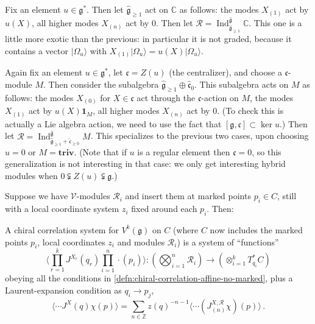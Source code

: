 \documentclass[12pt,letterpaper,reqno]{amsart}
\numberwithin{equation}{section}
\newcommand{\fg}{{\mathfrak g}}
\newcommand{\fc}{{\mathfrak c}}
\newcommand{\hfg}{{\widehat\fg}}
\newcommand{\hfc}{{\widehat\fc}}
\newcommand{\bbC}{\ensuremath{\mathbb C}}
\newcommand{\bbZ}{\ensuremath{\mathbb Z}}
\newcommand\bid{{\mathbf 1}}
\newcommand\vacu{{|\Omega_u\rangle}}
\newcommand\triv{{\mathbf {triv}}}
\newcommand{\vertex}{\mathcal{V}}
\newcommand{\vrep}{\mathcal{R}}
\newcommand{\IP}[1]{\langle#1\rangle}
\DeclareMathOperator{\Ind}{Ind}
\begin{document}
\begin{example} \label{exa:irregular-module}
Fix an element $u \in \fg^*$.
Then let $\hfg_{\ge 1}$ act on $\bbC$
as follows: the modes $X_{(1)}$ act by $u(X)$,
all higher modes $X_{(n)}$ act by $0$.
Then let $\vrep = \Ind^{\hfg}_{\hfg_{\ge 1}} \bbC$.
This one is a little more exotic than the previous: in particular it is not graded,
because it contains a vector $\vacu$ with $X_{(1)} \vacu = u(X) \vacu$.
\end{example}

\begin{example}
Again fix an element $u \in \fg^*$, let $\fc = Z(u)$ (the centralizer),
and choose a $\fc$-module $M$.
Then consider the subalgebra $\hfg_{\ge 1} \oplus \hfc_{0}$.
This subalgebra acts on $M$ as follows:
the modes $X_{(0)}$ for $X \in \fc$ act through the $\fc$-action on $M$,
the modes $X_{(1)}$ act by $u(X) \bid_M$,
all higher modes $X_{(n)}$ act by $0$.
(To check this is actually a Lie algebra action, we need to use the fact that $[\fg,\fc] \subset \ker u$.)
Then let $\vrep = \Ind^{\hfg}_{\hfg_{\ge 1} + \hfc_{\ge 0}} M$.
This specializes to the previous two cases, upon choosing $u = 0$ or $M = \triv$.
(Note that if $u$ is a regular element then $\fc = 0$, so this generalization is not interesting in that case:
we only get interesting hybrid modules when $0 \subsetneqq Z(u) \subsetneqq \fg$.)
\end{example}




Suppose we have
$\vertex$-modules $\vrep_i$ and insert them at 
marked points $p_i \in C$, still with a local coordinate
system $z_i$ fixed around each $p_i$. Then:

\begin{defn}
A chiral correlation system for $V^k(\fg)$ on $C$ (where $C$ now includes the marked points $p_i$, local coordinates
$z_i$ and modules $\vrep_i$) is a system of ``functions''
\begin{equation}
  \IP{ \prod_{r=1}^k J^{X_r}(q_r) \prod_{i=1}^n \cdot(p_i) } :  \left(  \bigotimes_{i=1}^n  \vrep_i \right) \to \left(  \otimes_{i=1}^k T^*_{q_i} C \right)
\end{equation}
obeying all the conditions in \autoref{defn:chiral-correlation-affine-no-marked}, plus
a Laurent-expansion condition as $q_i \to p_j$,
\begin{equation}
    \IP{ \cdots J^X(q) \chi(p) } = \sum_{n \in \bbZ} z(q)^{-n-1} \IP{\cdots (J^{X,\vrep}_{(n)} \chi)(p) } \, .
\end{equation}
\end{defn}
\end{document}
